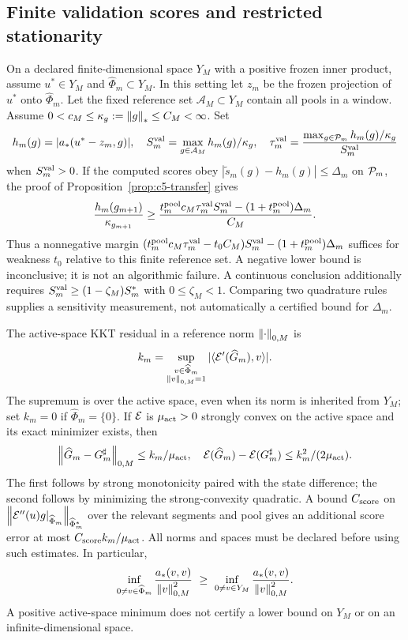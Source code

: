 \documentclass[11pt]{article}
\theoremstyle{remark}
\begin{document}
\subsection{Finite validation scores and restricted stationarity}
\label{sec:c5-validation}

On a declared finite-dimensional space $Y_M$ with a positive frozen inner
product, assume $u^*\in Y_M$ and $\widehat\Phi_m\subset Y_M$.
In this setting let $z_m$ be the frozen projection of $u^*$ onto
$\widehat\Phi_m$. Let the fixed reference set $\mathcal A_M\subset Y_M$
contain all pools in a window.
Assume $0<c_M\leq\kappa_g:=\left\lVert g\right\rVert_*\leq C_M<\infty$.
Set
\[
 h_m(g)=|a_*(u^*-z_m,g)|,\quad
 S_m^{\rm val}=\max_{g\in\mathcal A_M}h_m(g)/\kappa_g,\quad
 \tau_m^{\rm val}
   =\frac{\max_{g\in\mathcal P_m}h_m(g)/\kappa_g}{S_m^{\rm val}}
\]
when $S_m^{\rm val}>0$.
If the computed scores obey
$|\widetilde s_m(g)-h_m(g)|\leq\Delta_m$ on $\mathcal P_m$, the proof of
Proposition~\ref{prop:c5-transfer} gives
\begin{equation}
 \frac{h_m(g_{m+1})}{\kappa_{g_{m+1}}}
 \geq
 \frac{t_m^{\rm pool}c_M\tau_m^{\rm val}S_m^{\rm val}
             -(1+t_m^{\rm pool})\Delta_m}{C_M}.
 \label{eq:c5-finite-margin}
\end{equation}
Thus a nonnegative margin
$(t_m^{\rm pool}c_M\tau_m^{\rm val}-t_0C_M)S_m^{\rm val}
 -(1+t_m^{\rm pool})\Delta_m$ suffices for weakness $t_0$
relative to this finite reference set.
A negative lower bound is inconclusive; it is not an algorithmic failure.
A continuous conclusion additionally requires
$S_m^{\rm val}\geq(1-\zeta_M)S_m^*$ with $0\leq\zeta_M<1$.
Comparing two quadrature rules supplies a sensitivity measurement,
not automatically a certified bound for $\Delta_m$.

The active-space KKT residual in a reference norm $\left\lVert\cdot\right\rVert_{0,M}$ is
\begin{equation}
 k_m=\sup_{\substack{v\in\widehat\Phi_m\\\left\lVert v\right\rVert_{0,M}=1}}
              |\langle\mathcal E'(\widehat G_m),v\rangle|.
 \label{eq:c5-kkt}
\end{equation}
The supremum is over the active space, even when its norm is inherited
from $Y_M$; set $k_m=0$ if $\widehat\Phi_m=\{0\}$.
If $\mathcal E$ is $\mu_{\rm act}>0$ strongly convex on the active
space and its exact minimizer exists, then
\[
 \left\lVert\widehat G_m-G_m^\sharp\right\rVert_{0,M}\leq k_m/\mu_{\rm act},\quad
 \mathcal E(\widehat G_m)-\mathcal E(G_m^\sharp)\leq k_m^2/(2\mu_{\rm act}).
\]
The first follows by strong monotonicity paired with the state difference;
the second follows by minimizing the strong-convexity quadratic.
A bound $C_{\rm score}$ on
$\left\lVert\mathcal E''(u)g|_{\widehat\Phi_m}\right\rVert_{\widehat\Phi_m^*}$ over the
relevant segments and pool gives an additional score error at most
$C_{\rm score}k_m/\mu_{\rm act}$.
All norms and spaces must be declared before using such estimates.
In particular,
\[
 \inf_{0\ne v\in\widehat\Phi_m}\frac{a_*(v,v)}{\left\lVert v\right\rVert_{0,M}^2}
 \ \geq\
 \inf_{0\ne v\in Y_M}\frac{a_*(v,v)}{\left\lVert v\right\rVert_{0,M}^2}.
\]
A positive active-space minimum does not certify a lower bound on $Y_M$
or on an infinite-dimensional space.
\end{document}
